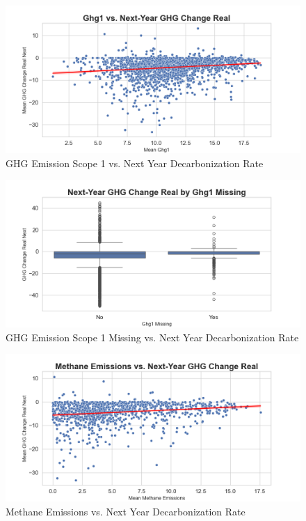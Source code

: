 \begin{figure}[H]
\centering
    \includegraphics[width=\textwidth]{figures/ghg1_vs_ghg_change_real_next.png}
\caption{GHG Emission Scope 1 vs. Next Year Decarbonization Rate}
\label{fig:ghg1_vs_ghg_change_real_next}
\end{figure}

\begin{figure}[H]
\centering
  \includegraphics[width=\textwidth]{figures/ghg_change_real_next_by_ghg1_na.png}
\caption{GHG Emission Scope 1 Missing vs. Next Year Decarbonization Rate}
\label{fig:ghg_change_real_next_by_ghg1_na}
\end{figure}

\begin{figure}[H]
\centering
  \includegraphics[width=\textwidth]{figures/methane_emissions_vs_ghg_change_real_next.png}
\caption{Methane Emissions vs. Next Year Decarbonization Rate}
\label{fig:methane_emissions_vs_ghg_change_real_next}
\end{figure}

